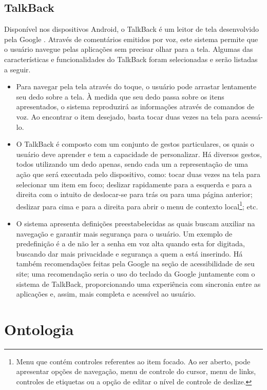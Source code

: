 \subsection{TalkBack}

Disponível nos dispositivos Android, o TalkBack é um leitor de tela desenvolvido pela Google \cite{TALKB2016}. Através de comentários emitidos por voz, este sistema permite que o usuário navegue pelas aplicações sem precisar olhar para a tela. Algumas das características e funcionalidades do TalkBack foram selecionadas e serão listadas a seguir.
\begin{itemize}
	\item Para navegar pela tela através do toque, o usuário pode arrastar lentamente seu dedo sobre a tela. À medida que seu dedo passa sobre os itens apresentados, o sistema reproduzirá as informações através de comandos de voz. Ao encontrar o item desejado, basta tocar duas vezes na tela para acessá-lo.
	\item O TalkBack é composto com um conjunto de gestos particulares, os quais o usuário deve aprender e tem a capacidade de personalizar. Há diversos gestos, todos utilizando um dedo apenas, sendo cada um a representação de uma ação que será executada pelo dispositivo, como: tocar duas vezes na tela para selecionar um item em foco; deslizar rapidamente para a esquerda e para a direita com o intuito de deslocar-se para trás ou para uma página anterior; deslizar para cima e para a direita para abrir o menu de contexto local\footnote{Menu que contém controles referentes ao item focado. Ao ser aberto, pode apresentar opções de navegação, menu de controle do cursor, menu de links, controles de etiquetas ou a opção de editar o nível de controle de deslize.}; etc.
	\item O sistema apresenta definições preestabelecidas as quais buscam auxiliar na navegação e garantir mais segurança para o usuário. Um exemplo de predefinição é a de não ler a senha em voz alta quando esta for digitada, buscando dar mais privacidade e segurança a quem a está inserindo. Há também recomendações feitas pela Google na seção de acessibilidade de seu site; uma recomendação seria o uso do teclado da Google juntamente com o sistema de TalkBack, proporcionando uma experiência com sincronia entre as aplicações e, assim, mais completa e acessível ao usuário.
\end{itemize}

\section{Ontologia}

